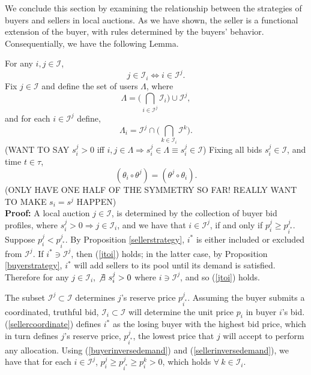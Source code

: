\documentclass[12pt]{article}
\theoremstyle{definition}
\newcommand{\mcI}{\mathcal{I}}
\begin{document}
\begin{multicols}{2}
We conclude this section by examining the relationship between the strategies of buyers and
sellers in local auctions. As we have shown, the seller
is a functional extension of the buyer, with rules determined by the buyers'
behavior. Consequentially, we have the following Lemma.

{
\label{userunion}
For any $i,j\in \mcI$, 
\begin{equation}\label{jtoi}
j\in\mcI_i \Leftrightarrow i\in\mcI^j.
\end{equation}
Fix $j\in\mcI$ and define the set of users $\Lambda$, where
\begin{equation}\label{lambda}
    \Lambda = \bigg(\displaystyle\bigcap_{i\in\mcI^j} \mcI_i \bigg) \cup \mcI^j,
\end{equation}
and for each $i\in\mcI^j$ define,
\begin{equation}\label{ilambda}
    \Lambda_i = \mcI^j \cap \bigg(\displaystyle\bigcap_{k\in\mcI_i} \mcI^k
\bigg).
\end{equation}
(WANT TO SAY $s_i^j > 0$ iff $i,j \in\Lambda \Rightarrow s_i^j \in \Lambda
\equiv s_i^j \in \mcI$)
Fixing all bids $s_i^j \in \mcI$, and time $t\in\tau$,
\begin{equation}\label{sym}
    (\theta_i \circ \theta^j) = (\theta^j \circ \theta_i).
\end{equation}
(ONLY HAVE ONE HALF OF THE SYMMETRY SO FAR! REALLY WANT TO MAKE $s_i = s^j$
HAPPEN)
}\\
\textbf{Proof:}
A local auction $j\in\mcI$, is determined by the collection of buyer bid
profiles, where $s_i^j > 0 \Rightarrow j\in\mcI_i$, and we have that $i\in\mcI^j$,
if and only if $p_i^j \ge p_{i^*}^j$.
Suppose $p_i^j < p_{i^*}^j$. By Proposition \ref{sellerstrategy}, $i^*$ is either included or excluded from $\mcI^j$. 
If $i^* \ni \mcI^j$, then (\ref{jtoi}) holds; in the latter case, by
Proposition \ref{buyerstrategy}, $i^*$
will add sellers to its pool until its demand is satisfied. Therefore for any
$j\in\mcI_i$, $\not\exists \ s_i^j > 0$ where $i \ni \mcI^j$, and so (\ref{jtoi})
holds.

The subset $\mcI^j \subset \mcI$
determines $j$'s reserve price $p_{i^*}^j$. Assuming the buyer submits a
coordinated, truthful bid, $\mcI_i\subset \mcI$ 
will determine the unit price $p_{i}$ in buyer $i$'s bid.
(\ref{sellercoordinate}) defines $i^*$ as the losing buyer with the highest bid
price, which in turn defines $j$'s reserve price, $p_{i^*}^j$,
the lowest price that $j$ will accept to perform any allocation.
Using (\ref{buyerinversedemand}) and (\ref{sellerinversedemand}),
we have that for each $i \in \mcI^j$, 
$p_{i}^j \ge p_{i^*}^j \ge p_i^k > 0$, which holds $\forall \ k \in\mcI_i$.


\end{multicols}
\end{document}
